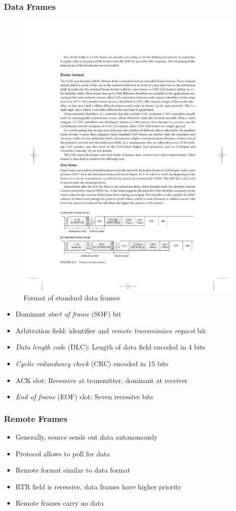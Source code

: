 \documentclass{beamer}
\begin{document}
\begin{frame}
	\frametitle{Data Frames}
	\begin{figure}
		\includegraphics[width=.6\textwidth]{dataframe.pdf} 
		\caption{Format of standard data frames}%
	\end{figure}
	\begin{itemize}
		\item Dominant \emph{start of frame} (SOF) bit
		\item Arbitration field: identifier and \emph{remote transmission request} bit
		\item \emph{Data length code} (DLC): Length of data field encoded in 4 bits
		\item \emph{Cyclic redundancy check} (CRC) encoded in 15 bits
		\item ACK slot: Recessive at transmitter, dominant at receiver
		\item \emph{End of frame} (EOF) slot: Seven recessive bits
	\end{itemize}
\end{frame}

\begin{frame}
	\frametitle{Remote Frames}
	\begin{itemize}
		\item Generally, source sends out data autonomously
		\item Protocol allows to poll for data
		\item Remote format similar to data format
		\item RTR field is recessive, data frames have higher priority
		\item Remote frames carry no data
	\end{itemize}
\end{frame}
\end{document}
